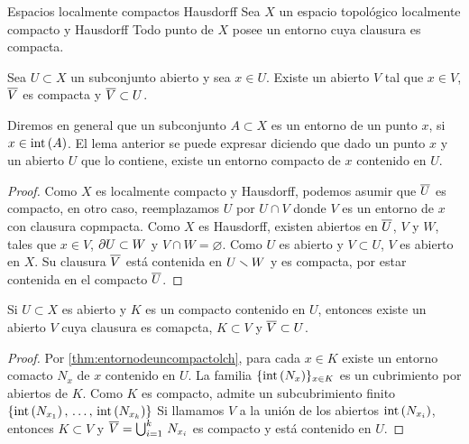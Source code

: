 \begin{subsubsection}{Espacios localmente compactos Hausdorff}
Sea $X$ un espacio topol\'{o}gico localmente compacto y Hausdorff
Todo punto de $X$ posee un entorno cuya clausura es compacta.

\begin{lemaEntornoDeUnPuntoLCH}\label{thm:entornodeunpuntolch}
	Sea $U\subset X$ un subconjunto abierto y sea $x\in U$. Existe
	un abierto $V$ tal que $x\in V$, $\clos{V}$ es compacta y
	$\clos{V}\subset U$.
\end{lemaEntornoDeUnPuntoLCH}

Diremos en general que un subconjunto $A\subset X$ es un entorno de un
punto $x$, si $x\in\interior{A}$. El lema anterior se puede expresar
diciendo que dado un punto $x$ y un abierto $U$ que lo contiene,
existe un entorno compacto de $x$ contenido en $U$.

\begin{proof}
	Como $X$ es localmente compacto y Hausdorff, podemos asumir que
	$\clos{U}$ es compacto, en otro caso, reemplazamos $U$ por
	$U\cap V$ donde $V$ es un entorno de $x$ con clausura copmpacta.
	Como $X$ es Hausdorff, existen abiertos en $\clos{U}$, $V$ y $W$,
	tales que $x\in V$, $\borde[U]\subset W$ y $V\cap W=\varnothing$.
	Como $U$ es abierto y $V\subset U$, $V$ es abierto en $X$. Su
	clausura $\clos{V}$ est\'{a} contenida en $U\setmin W$ y es compacta,
	por estar contenida en el compacto $\clos{U}$.
\end{proof}

\begin{lemaEntornoDeUnCompactoLCH}\label{thm:entornodeuncompactolch}
	Si $U\subset X$ es abierto y $K$ es un compacto contenido
	en $U$, entonces existe un abierto $V$ cuya clausura es
	comapcta, $K\subset V$ y $\clos{V}\subset U$.
\end{lemaEntornoDeUnCompactoLCH}

\begin{proof}
	Por \ref{thm:entornodeuncompactolch}, para cada $x\in K$ existe un
	entorno comacto $N_{x}$ de $x$ contenido en $U$. La familia
	$\{\interior{N_{x}}\}_{x\in K}$ es un cubrimiento por abiertos
	de $K$. Como $K$ es compacto, admite un subcubrimiento finito
	$\{\interior{N_{x_{1}}},\,\dots,\,\interior{N_{x_{k}}}\}$
	Si llamamos $V$ a la uni\'{o}n de los abiertos $\interior{N_{x_{i}}}$,
	entonces $K\subset V$ y $\clos{V}=\bigcup_{i=1}^{k}\,N_{x_{i}}$ es
	compacto y est\'{a} contenido en $U$.
\end{proof}


\end{subsubsection}
